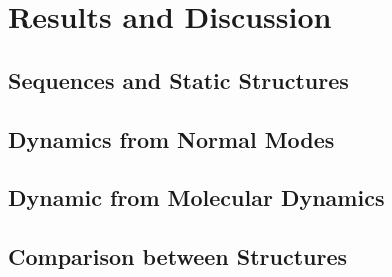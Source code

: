 \chapter{Results and Discussion}

\section{Sequences and Static Structures}

\section{Dynamics from Normal Modes}

\section{Dynamic from Molecular Dynamics}

\section{Comparison between Structures}